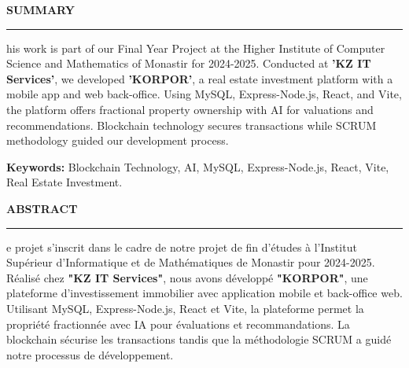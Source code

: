 \thispagestyle{empty} %
\vspace{2.5cm}

\begin{center}
{\color{primary}\Large\textbf{\MakeUppercase{Summary}}}
\end{center}
\vspace{0.1cm}
\begin{center}
\rule{0.6\textwidth}{1pt}
\end{center}
\vspace{0.5cm}

\noindent {}his work is part of our Final Year Project at the Higher Institute of Computer Science and Mathematics of Monastir for 2024-2025. Conducted at \textbf{\textcolor{primary}{'KZ IT Services'}}, we developed \textbf{\textcolor{primary}{'KORPOR'}}, a real estate investment platform with a mobile app and web back-office. Using MySQL, Express-Node.js, React, and Vite, the platform offers fractional property ownership with AI for valuations and recommendations. Blockchain technology secures transactions while SCRUM methodology guided our development process.

\vspace{0.3cm}
\begin{tcolorbox}[
    colback=background,
    colframe=primary,
    arc=1mm,
    boxrule=0.5pt,
    left=8pt,
    right=8pt,
    top=4pt,
    bottom=4pt,
    width=\textwidth
]
\textbf{Keywords:} Blockchain Technology, AI, MySQL, Express-Node.js, React, Vite, Real Estate Investment.
\end{tcolorbox}

\vspace{3cm} %

\begin{center}
{\color{primary}\Large\textbf{\MakeUppercase{Abstract}}}
\end{center}
\vspace{0.1cm}
\begin{center}
\rule{0.6\textwidth}{1pt}
\end{center}
\vspace{0.5cm}

\noindent {}e projet s'inscrit dans le cadre de notre projet de fin d'études à l'Institut Supérieur d'Informatique et de Mathématiques de Monastir pour 2024-2025. Réalisé chez \textbf{\textcolor{primary}{"KZ IT Services"}}, nous avons développé \textbf{\textcolor{primary}{"KORPOR"}}, une plateforme d'investissement immobilier avec application mobile et back-office web. Utilisant MySQL, Express-Node.js, React et Vite, la plateforme permet la propriété fractionnée avec IA pour évaluations et recommandations. La blockchain sécurise les transactions tandis que la méthodologie SCRUM a guidé notre processus de développement.


